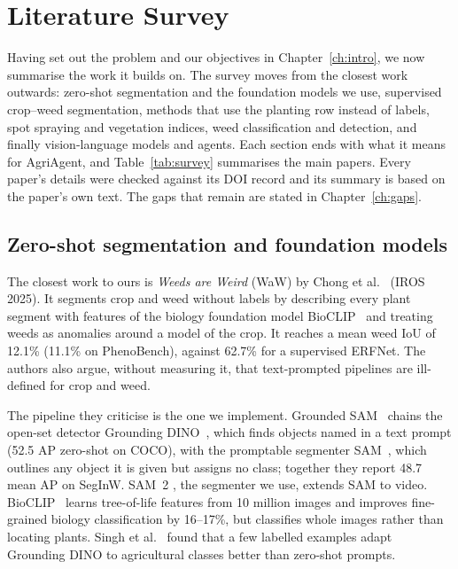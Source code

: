 \chapter{Literature Survey}\label{ch:survey}

Having set out the problem and our objectives in Chapter~\ref{ch:intro}, we now summarise the work it
builds on. The survey moves from the closest work outwards: zero-shot segmentation and the foundation
models we use, supervised crop--weed segmentation, methods that use the planting row instead of labels,
spot spraying and vegetation indices, weed classification and detection, and finally vision-language
models and agents. Each section ends with what it means for AgriAgent, and Table~\ref{tab:survey}
summarises the main papers. Every paper's details were checked against its DOI record and its summary
is based on the paper's own text. The gaps that remain are stated in Chapter~\ref{ch:gaps}.

\section{Zero-shot segmentation and foundation models}\label{sec:lit-zeroshot}
The closest work to ours is \emph{Weeds are Weird} (WaW) by Chong et al.~\cite{chong2025zeroshot}
(IROS 2025). It segments crop and weed without labels by describing every plant segment with features
of the biology foundation model BioCLIP~\cite{stevens2024bioclip} and treating weeds as anomalies
around a model of the crop. It reaches a mean weed IoU of 12.1\% (11.1\% on PhenoBench), against 62.7\%
for a supervised ERFNet. The authors also argue, without measuring it, that text-prompted pipelines are
ill-defined for crop and weed.

The pipeline they criticise is the one we implement. Grounded SAM~\cite{ren2024groundedsam} chains the
open-set detector Grounding DINO~\cite{liu2024groundingdino}, which finds objects named in a text prompt
(52.5 AP zero-shot on COCO), with the promptable segmenter SAM~\cite{kirillov2023sam}, which outlines
any object it is given but assigns no class; together they report 48.7 mean AP on SegInW. SAM~2
\cite{ravi2025sam2}, the segmenter we use, extends SAM to video. BioCLIP~\cite{stevens2024bioclip}
learns tree-of-life features from 10 million images and improves fine-grained biology classification by
16--17\%, but classifies whole images rather than locating plants. Singh et al.~\cite{singh2025fewshot}
found that a few labelled examples adapt Grounding DINO to agricultural classes better than zero-shot
prompts.

